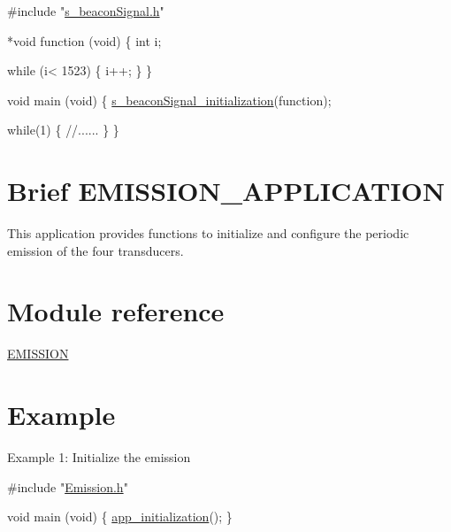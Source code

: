 \begin{DoxyCode}
\textcolor{preprocessor}{  #include "\hyperlink{s__beacon_signal_8h}{s\_beaconSignal.h}"}
  
*\textcolor{keywordtype}{void} \textcolor{keyword}{function} (void)
 \{
    \textcolor{keywordtype}{int} i;
    
    \textcolor{keywordflow}{while} (i< 1523)
    \{
        i++;
        \}
 \}
 
  \textcolor{keywordtype}{void} main (\textcolor{keywordtype}{void})
  \{
    \hyperlink{group__beacon_signal___function_gacbfa3327cc59cede48c905ac55acebbf}{s\_beaconSignal\_initialization}(\textcolor{keyword}{function});
 
     \textcolor{keywordflow}{while}(1)
        \{
        \textcolor{comment}{//......}
    \}
 \}
\end{DoxyCode}
\hypertarget{_s_t_m32__s_i_g_n_a_l__e_m_i_s_s_i_o_n_EMISSION_intro}{}\section{Brief E\+M\+I\+S\+S\+I\+O\+N\+\_\+\+A\+P\+P\+L\+I\+C\+A\+T\+I\+O\+N}\label{_s_t_m32__s_i_g_n_a_l__e_m_i_s_s_i_o_n_EMISSION_intro}
This application provides functions to initialize and configure the periodic emission of the four transducers.\hypertarget{_s_t_m32__s_i_g_n_a_l__e_m_i_s_s_i_o_n_EMISSION_reference}{}\section{Module reference}\label{_s_t_m32__s_i_g_n_a_l__e_m_i_s_s_i_o_n_EMISSION_reference}

\begin{DoxyItemize}
\item \hyperlink{group___emission___module}{E\+M\+I\+S\+S\+I\+O\+N}
\end{DoxyItemize}\hypertarget{_s_t_m32__s_i_g_n_a_l__e_m_i_s_s_i_o_n_EMISSION_exemples}{}\section{Example}\label{_s_t_m32__s_i_g_n_a_l__e_m_i_s_s_i_o_n_EMISSION_exemples}
Example 1\+: Initialize the emission


\begin{DoxyCode}
\textcolor{preprocessor}{#include "\hyperlink{_emission_8h}{Emission.h}"}

\textcolor{keywordtype}{void} main (\textcolor{keywordtype}{void})
\{
 \hyperlink{group___emission___function_ga0286d33091b7353c6f70cbc413767cfc}{app\_initialization}();
\}
\end{DoxyCode}
 